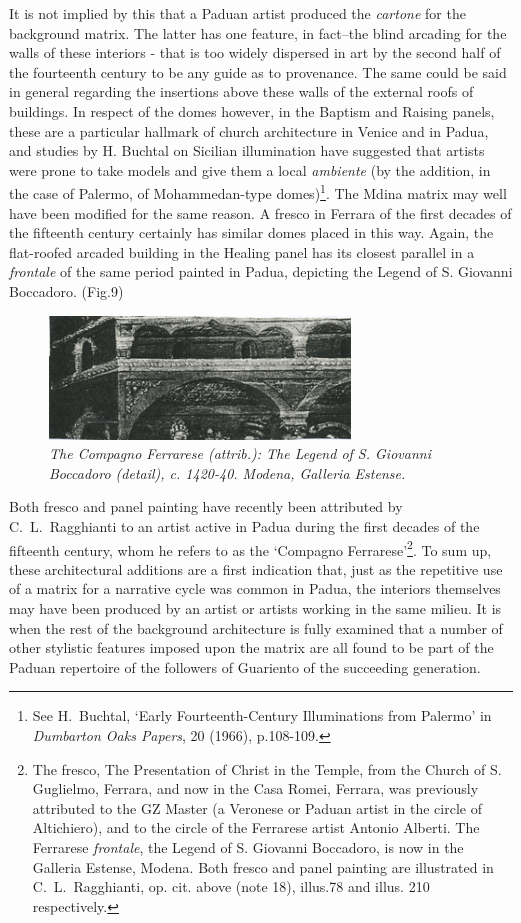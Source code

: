 \documentclass[a4paper,12pt]{article}
\begin{document}
It is not implied by this that a Paduan artist produced the
\textit{cartone} for the background matrix.  The latter has one
feature, in fact--the blind arcading for the walls of these interiors
- that is too widely dispersed in art by the second half of the
fourteenth century to be any guide as to provenance. The same could be
said in general regarding the insertions above these walls of the
external roofs of buildings. In respect of the domes however, in the
Baptism and Raising panels, these are a particular hallmark of church
architecture in Venice and in Padua, and studies by H. Buchtal on
Sicilian illumination have suggested that artists were prone to take
models and give them a local \textit{ambiente} (by the addition, in
the case of Palermo, of Mohammedan-type domes)\footnote{See H.~Buchtal,
`Early Fourteenth-Century Illuminations from Palermo' in
\textit{Dumbarton Oaks Papers}, 20 (1966), p.108-109.}. The Mdina
matrix may well have been modified for the same reason. A fresco in
Ferrara of the first decades of the fifteenth century certainly has
similar domes placed in this way. Again, the flat-roofed arcaded
building in the Healing panel has its closest parallel in a
\textit{frontale} of the same period painted in Padua, depicting the
Legend of S. Giovanni Boccadoro. (Fig.9)
\begin{figure}[htbp]
\centering
\includegraphics[width=8cm]{pics/fig9.png}
\caption[The Compagno Ferrarese (attrib.): The Legend of
  S. Giovanni Boccadoro (detail)]
{\it The Compagno Ferrarese (attrib.): The Legend of
  S. Giovanni Boccadoro (detail), c. 1420-40.  Modena, Galleria Estense.} 
\end{figure}
Both fresco and panel
painting have recently been attributed by C.~L.~Ragghianti to an artist
active in Padua during the first decades of the fifteenth century,
whom he refers to as the `Compagno Ferrarese'\footnote{The fresco, The
Presentation of Christ in the Temple, from the Church of S. Guglielmo,
Ferrara, and now in the Casa Romei, Ferrara, was previously attributed
to the GZ Master (a Veronese or Paduan artist in the circle of
Altichiero), and to the circle of the Ferrarese artist Antonio
Alberti. The Ferrarese \textit{frontale}, the Legend of S. Giovanni
Boccadoro, is now in the Galleria Estense, Modena. Both fresco and
panel painting are illustrated in C.~L.~Ragghianti, op. cit. above (note
18), illus.78 and illus. 210 respectively.}. To sum up, these
architectural additions are a first indication that, just as the
repetitive use of a matrix for a narrative cycle was common in Padua,
the interiors themselves may have been produced by an artist or
artists working in the same milieu. It is when the rest of the
background architecture is fully examined that a number of other
stylistic features imposed upon the matrix are all found to be part of
the Paduan repertoire of the followers of Guariento of the succeeding
generation.
\end{document}
